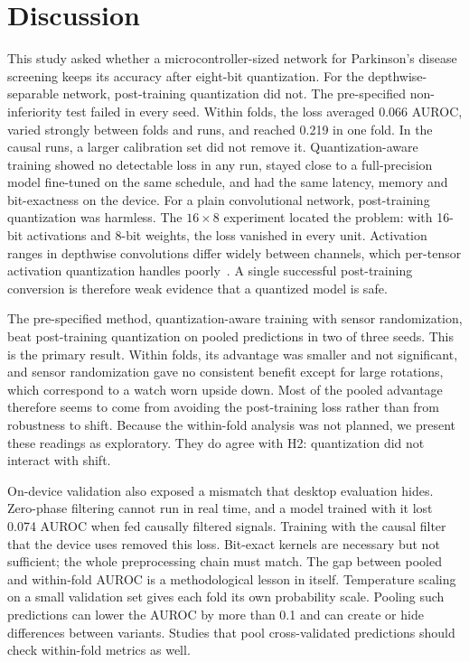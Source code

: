 \documentclass[journal,twoside,web]{ieeecolor}
\begin{document}
\section{Discussion}
This study asked whether a microcontroller-sized network for Parkinson's disease screening keeps its accuracy after eight-bit quantization. For the depthwise-separable network, post-training quantization did not. The pre-specified non-inferiority test failed in every seed. Within folds, the loss averaged 0.066 AUROC, varied strongly between folds and runs, and reached 0.219 in one fold. In the causal runs, a larger calibration set did not remove it. Quantization-aware training showed no detectable loss in any run, stayed close to a full-precision model fine-tuned on the same schedule, and had the same latency, memory and bit-exactness on the device. For a plain convolutional network, post-training quantization was harmless. The $16\times8$ experiment located the problem: with 16-bit activations and 8-bit weights, the loss vanished in every unit. Activation ranges in depthwise convolutions differ widely between channels, which per-tensor activation quantization handles poorly~\cite{Krishnamoorthi2018,Nagel2021}. A single successful post-training conversion is therefore weak evidence that a quantized model is safe.

The pre-specified method, quantization-aware training with sensor randomization, beat post-training quantization on pooled predictions in two of three seeds. This is the primary result. Within folds, its advantage was smaller and not significant, and sensor randomization gave no consistent benefit except for large rotations, which correspond to a watch worn upside down. Most of the pooled advantage therefore seems to come from avoiding the post-training loss rather than from robustness to shift. Because the within-fold analysis was not planned, we present these readings as exploratory. They do agree with H2: quantization did not interact with shift.

On-device validation also exposed a mismatch that desktop evaluation hides. Zero-phase filtering cannot run in real time, and a model trained with it lost 0.074 AUROC when fed causally filtered signals. Training with the causal filter that the device uses removed this loss. Bit-exact kernels are necessary but not sufficient; the whole preprocessing chain must match. The gap between pooled and within-fold AUROC is a methodological lesson in itself. Temperature scaling on a small validation set gives each fold its own probability scale. Pooling such predictions can lower the AUROC by more than 0.1 and can create or hide differences between variants. Studies that pool cross-validated predictions should check within-fold metrics as well.
\end{document}
